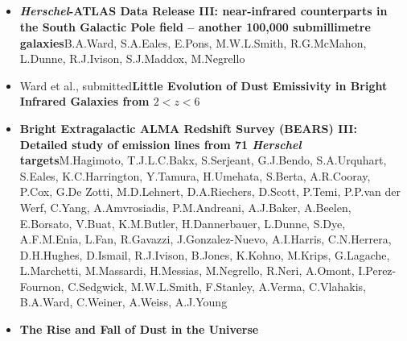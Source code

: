 \subsection*{}

\begin{itemize}
  \item[]{\citealt{Ward_2022}\newline\textbf{\textit{Herschel}-ATLAS Data Release III: near-infrared counterparts in the South Galactic Pole field -- another 100,000 submillimetre galaxies}\newline B.A.Ward, S.A.Eales, E.Pons, M.W.L.Smith, R.G.McMahon, L.Dunne, R.J.Ivison, S.J.Maddox, M.Negrello}
  
  \item[]{Ward et al., submitted}\newline\textbf{Little Evolution of Dust Emissivity in Bright Infrared Galaxies from $2 < z < 6$}
\end{itemize} 


\begin{itemize}

  \item[]{\citealt{Hagimoto_2023}\newline\textbf{Bright Extragalactic ALMA Redshift Survey (BEARS) III: Detailed study of emission lines from 71 \textit{Herschel} targets}\newline M.Hagimoto, T.J.L.C.Bakx, S.Serjeant, G.J.Bendo, S.A.Urquhart, S.Eales, K.C.Harrington, Y.Tamura, H.Umehata, S.Berta, A.R.Cooray, P.Cox, G.De Zotti, M.D.Lehnert, D.A.Riechers, D.Scott, P.Temi, P.P.van der Werf, C.Yang, A.Amvrosiadis, P.M.Andreani, A.J.Baker, A.Beelen, E.Borsato, V.Buat, K.M.Butler, H.Dannerbauer, L.Dunne, S.Dye, A.F.M.Enia, L.Fan, R.Gavazzi, J.Gonzalez-Nuevo, A.I.Harris, C.N.Herrera, D.H.Hughes, D.Ismail, R.J.Ivison, B.Jones, K.Kohno, M.Krips, G.Lagache, L.Marchetti, M.Massardi, H.Messias, M.Negrello, R.Neri, A.Omont, I.Perez-Fournon, C.Sedgwick, M.W.L.Smith, F.Stanley, A.Verma, C.Vlahakis, B.A.Ward, C.Weiner, A.Weiss, A.J.Young}
  
  \item[]{\citealt{Eales_2024}}\newline\textbf{The Rise and Fall of Dust in the Universe}
 
\end{itemize}  